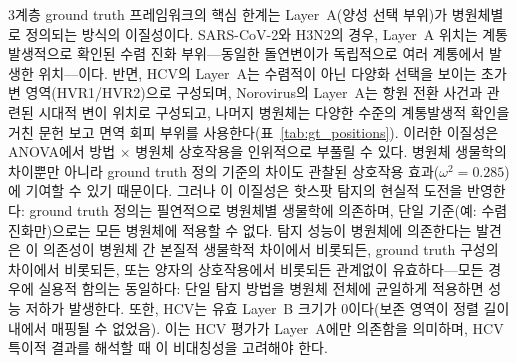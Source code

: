 3계층 ground truth 프레임워크의 핵심 한계는 Layer~A(양성 선택 부위)가 병원체별로 정의되는 방식의 이질성이다.
SARS-CoV-2와 H3N2의 경우, Layer~A 위치는 계통발생적으로 확인된 수렴 진화 부위---동일한 돌연변이가 독립적으로 여러 계통에서 발생한 위치---이다.
반면, HCV의 Layer~A는 수렴적이 아닌 다양화 선택을 보이는 초가변 영역(HVR1/HVR2)으로 구성되며, Norovirus의 Layer~A는 항원 전환 사건과 관련된 시대적 변이 위치로 구성되고, 나머지 병원체는 다양한 수준의 계통발생적 확인을 거친 문헌 보고 면역 회피 부위를 사용한다(표~\ref{tab:gt_positions}).
이러한 이질성은 ANOVA에서 방법 $\times$ 병원체 상호작용을 인위적으로 부풀릴 수 있다. 병원체 생물학의 차이뿐만 아니라 ground truth 정의 기준의 차이도 관찰된 상호작용 효과($\omega^2 = 0.285$)에 기여할 수 있기 때문이다.
그러나 이 이질성은 핫스팟 탐지의 현실적 도전을 반영한다: ground truth 정의는 필연적으로 병원체별 생물학에 의존하며, 단일 기준(예: 수렴 진화만)으로는 모든 병원체에 적용할 수 없다.
탐지 성능이 병원체에 의존한다는 발견은 이 의존성이 병원체 간 본질적 생물학적 차이에서 비롯되든, ground truth 구성의 차이에서 비롯되든, 또는 양자의 상호작용에서 비롯되든 관계없이 유효하다---모든 경우에 실용적 함의는 동일하다: 단일 탐지 방법을 병원체 전체에 균일하게 적용하면 성능 저하가 발생한다.
또한, HCV는 유효 Layer~B 크기가 0이다(보존 영역이 정렬 길이 내에서 매핑될 수 없었음). 이는 HCV 평가가 Layer~A에만 의존함을 의미하며, HCV 특이적 결과를 해석할 때 이 비대칭성을 고려해야 한다.
